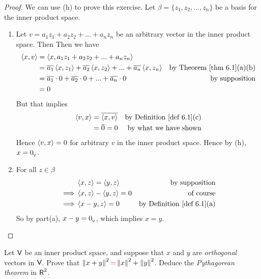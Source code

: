 \begin{proof}
We can use (h) to prove this exercise.
Let \(\beta = \{ z_1, z_2, ..., z_n \}\) be a basis for the inner product space.
\begin{enumerate}
\item Let \(v = a_1 z_1 + a_2 z_2 + ... + a_n z_n\) be an arbitrary vector in the inner product space.
Then Then we have
\begin{align*}
    \LG x, v \RG & = \LG x, a_1 z_1 + a_2 z_2 + ... + a_n z_n \RG \\
        & = \conjugatet{a_1} \LG x, z_1 \RG + \conjugatet{a_2} \LG x, z_2 \RG + ... + \conjugatet{a_n} \LG x, z_n \RG & \text{by \THM{6.1}(a)(b)} \\
        & = \conjugatet{a_1} \cdot 0 + \conjugatet{a_2} \cdot 0 + ... + \conjugatet{a_n} \cdot 0 & \text{by supposition} \\
        & = 0
\end{align*}
But that implies
\begin{align*}
    \LG v, x \RG & = \conjugatet{\LG x, v \RG} & \text{by \DEF{6.1}(c)} \\
        & = \conjugatet{0} = 0 & \text{by what we have shown}
\end{align*}
Hence \(\left< v, x \right> = 0\) for arbitrary \(v\) in the inner product space.
Hence by (h), \(x = 0_{_{\textsf{V}}}\).

\item For all \(z \in \beta\)
\begin{align*}
             & \LG x, z \RG = \LG y, z \RG & \text{by supposition} \\
    \implies & \LG x, z \RG - \LG y, z \RG = 0 & \text{of course} \\
    \implies & \LG x - y, z \RG = 0 & \text{by \DEF{6.1}(a)} \\
\end{align*}
So by part(a), \(x - y = 0_{_{\textsf{V}}}\), which implies \(x = y\).
\end{enumerate}
\end{proof}

\begin{exercise} \label{exercise 6.1.10}
Let \(\textsf{V}\) be an inner product space, and suppose that \(x\) and \(y\) are \emph{orthogonal} vectors in \(\textsf{V}\).
Prove that \(\norm{x + y}^2 \RED{=} \norm{x}^2 + \norm{y}^2\).
Deduce the \emph{Pythagorean theorem} in \(\textsf{R}^2\).
\end{exercise}

